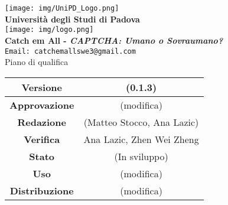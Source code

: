 \thispagestyle{empty}
\begin{titlepage}
\begin{center}
	\texttt{[image: img/UniPD\_Logo.png]}\\
	\bigskip
	\large \textbf{Università degli Studi di Padova}\\
	
	\texttt{[image: img/logo.png]}\\
	\bigskip
	\large \textbf{Catch em All - \textit{CAPTCHA: Umano o Sovraumano?}}\\
	\texttt{Email: catchemallswe3@gmail.com}\\
	\vfill
	{\fontsize{1.5cm}{0}\selectfont Piano di qualifica}\\
	\vfill
	\begin{tabularx}{\textwidth}{| c | c |}
		\hline
		\textbf{Versione} & (0.1.3)\\
		\hline
		\textbf{Approvazione} & (modifica)\\
		\hline
		\textbf{Redazione} & (Matteo Stocco, Ana Lazic)\\
		\hline
		\textbf{Verifica} & Ana Lazic, Zhen Wei Zheng\\
		\hline
		\textbf{Stato} & (In sviluppo)\\
		\hline
		\textbf{Uso} & (modifica)\\
		\hline
		\textbf{Distribuzione} & (modifica)\\
		\hline
	\end{tabularx}
\end{center}
\end{titlepage}
